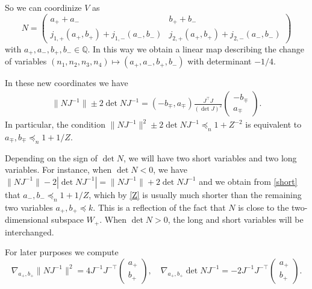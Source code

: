 \documentclass[11pt]{amsart}
\numberwithin{equation}{section}
\theoremstyle{plain}
\theoremstyle{definition}
\numberwithin{equation}{section}
\begin{document}
So we can coordinize $V$ as
\begin{equation}\label{coord}
N = \left(\begin{matrix} a_+ + a_- & b_+ + b_-\\ j_{1, +}(a_+, b_+) +   j_{1, -}(a_-, b_-) &  j_{2, +}(a_+, b_+) +   j_{2, -}(a_-, b_-) \end{matrix}\right)
\end{equation}
with $a_+, a_-, b_+, b_-\in \mathbb{Q}$. In this way we obtain a linear map describing the change of variables $(n_1, n_2, n_3, n_4) \mapsto (a_+, a_-, b_+, b_-)$ with determinant $-1/4$. 

In these new coordinates we have
\begin{align} \label{short}
\| NJ^{-1} \| \pm 2\det NJ^{-1}  = (-b_{\mp}, a_{\mp}) \frac{J^{\top} J}{(\det J)^2} \left(\begin{matrix}-b_{\mp}\\ a_{\mp}\end{matrix}\right).
\end{align}
In particular, the condition $\| NJ^{-1} \|^2 \pm 2 \det NJ^{-1}  \preccurlyeq_{n} 1+  Z^{-2}$ is equivalent to $a_{\mp}, b_{\mp} \preccurlyeq_{n} 1+ 1/Z$. 

Depending on the sign of $\det N$, we will have two short variables and two long variables. For instance, when $\det N<0$, we have $\| NJ^{-1} \| - 2 |\det NJ^{-1}| = \| NJ^{-1} \| + 2\det NJ^{-1}$ and we obtain from \eqref{short} that $a_{-}, b_{-}  \preccurlyeq_{n} 1+ 1/Z$, which by \eqref{Z} is usually much shorter than the remaining two variables $a_{+}, b_{+}\preccurlyeq  k$. This is a reflection of the fact that $N$ is close to the two-dimensional subspace $W_+$. 
When $\det N>0$, the long and short variables will be interchanged. 

For later purposes we compute
\begin{equation}\label{diff}
\nabla_{a_+, b_+}  \| N J^{-1}\|^2 = 4J^{-1} J^{-\top}  \left(\begin{matrix} a_+\\ b_+ \end{matrix}\right)  , \quad \nabla_{a_+, b_+}  \det N J^{-1}  = -2J^{-1} J^{-\top}  \left(\begin{matrix} a_+\\ b_+ \end{matrix}\right). 
\end{equation}
\end{document}
